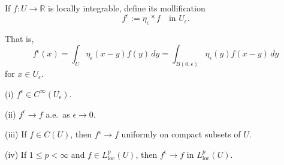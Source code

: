 \begin{definition}[Mollification]
\label{def:mollification}
If $f : U \to \mathbb{R}$ is locally integrable, define its mollification
$$f^\epsilon := \eta_\epsilon * f \quad \text{in } U_\epsilon.$$

That is,
$$f^\epsilon(x) = \int_U \eta_\epsilon(x-y)f(y) \, dy = \int_{B(0,\epsilon)} \eta_\epsilon(y)f(x-y) \, dy$$
for $x \in U_\epsilon$.
\end{definition}

\begin{theorem}
\label{thm:properties-of-mollifiers}
(i) $f^\epsilon \in C^\infty(U_\epsilon)$.

(ii) $f^\epsilon \to f$ a.e.\ as $\epsilon \to 0$.

(iii) If $f \in C(U)$, then $f^\epsilon \to f$ uniformly on compact subsets of $U$.

(iv) If $1 \le p < \infty$ and $f \in L^p_{\text{loc}}(U)$, then $f^\epsilon \to f$ in $L^p_{\text{loc}}(U)$.
\end{theorem}

